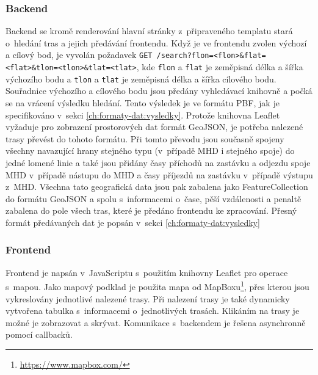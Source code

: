 \subsubsection{Backend}
Backend se kromě renderování hlavní stránky z~připraveného templatu stará
o~hledání tras a jejich předávání frontendu. Když je ve frontendu zvolen výchozí a
cílový bod, je vyvolán požadavek {\tt GET
/search?flon=<flon>\&flat=<flat>\&tlon=<tlon>\&tlat=<tlat>}, kde {\tt flon} a
{\tt flat} je zeměpisná délka a šířka výchozího bodu a {\tt tlon} a {\tt tlat}
je zeměpisná délka a šířka cílového bodu. Souřadnice výchozího a cílového bodu
jsou předány vyhledávací knihovně a počká se na vrácení výsledku hledání. Tento
výsledek je ve formátu PBF, jak je specifikováno v~sekci \ref{ch:formaty-dat:vysledky}.
Protože knihovna Leaflet vyžaduje pro zobrazení prostorových dat formát
GeoJSON\cite{GeoJSON}, je potřeba nalezené trasy převést do tohoto formátu. Při
tomto převodu jsou současně spojeny všechny navazující hrany stejného typu
(v~případě MHD i stejného spoje) do jedné lomené linie a také jsou přidány časy
příchodů na zastávku a odjezdu spoje MHD v~případě nástupu do MHD a časy
příjezdů na zastávku v~případě výstupu z~MHD. Všechna tato geografická data jsou
pak zabalena jako FeatureCollection do formátu GeoJSON a spolu s~informacemi
o~čase, pěší vzdálenosti a penaltě zabalena do pole všech tras, které je předáno
frontendu ke zpracování. Přesný formát předávaných dat je popsán v~sekci \ref{ch:formaty-dat:vysledky}
\subsubsection{Frontend}
Frontend je napsán v~JavaScriptu s~použitím knihovny Leaflet pro operace
s~mapou. Jako mapový podklad je použita mapa od
MapBoxu\footnote{\url{https://www.mapbox.com/}}, přes kterou
jsou vykreslovány jednotlivé nalezené trasy. Při nalezení trasy je také
dynamicky vytvořena tabulka s~informacemi o~jednotlivých trasách. Klikáním na
trasy je možné je zobrazovat a skrývat. Komunikace s~backendem je řešena
asynchronně pomocí callbacků.
